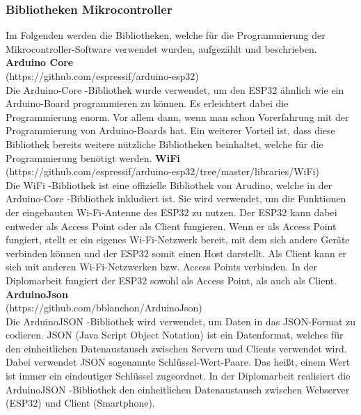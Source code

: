 \documentclass[11pt, twoside]{article}
\begin{document}
\subsubsection{Bibliotheken Mikrocontroller}
Im Folgenden werden die Bibliotheken, welche für die Programmierung der Mikrocontroller-Software verwendet wurden, aufgezählt und beschrieben.
\vspace{4mm}\newline
\textbf{Arduino Core} \\
(https://github.com/espressif/arduino-esp32) \\
Die \glqq Arduino-Core \grqq{} -Bibliothek wurde verwendet, um den ESP32 ähnlich wie ein Arduino-Board programmieren zu können. Es erleichtert dabei die Programmierung enorm. Vor allem dann, wenn man schon Vorerfahrung mit der Programmierung von Arduino-Boards hat. Ein weiterer Vorteil ist, dass diese Bibliothek bereits weitere nützliche Bibliotheken beinhaltet, welche für die Programmierung benötigt werden.
\vspace{4mm}\newline
\textbf{WiFi} \\
(https://github.com/espressif/arduino-esp32/tree/master/libraries/WiFi) \\
Die \grqq{} WiFi \grqq{} -Bibliothek ist eine offizielle Bibliothek von Arudino, welche in der \grqq{} Arduino-Core \grqq{} -Bibliothek inkludiert ist. Sie wird verwendet, um die Funktionen der eingebauten Wi-Fi-Antenne des ESP32 zu nutzen. Der ESP32 kann dabei entweder als Access Point oder als Client fungieren. Wenn er als Access Point fungiert, stellt er ein eigenes Wi-Fi-Netzwerk bereit, mit dem sich andere Geräte verbinden können und der ESP32 somit einen Host darstellt. Als Client kann er sich mit anderen Wi-Fi-Netzwerken bzw. Access Points verbinden. In der Diplomarbeit fungiert der ESP32 sowohl als Access Point, als auch als Client. \parencite[vgl.][]{noauthor_urlpi24_nodate}
\vspace{4mm}\newline
\textbf{ArduinoJson} \\
(https://github.com/bblanchon/ArduinoJson) \\
Die \glqq ArduinoJSON \grqq{} -Bibliothek wird verwendet, um Daten in das JSON-Format zu codieren. JSON (Java Script Object Notation) ist ein Datenformat, welches  für den einheitlichen Datenaustausch zwischen Servern und Clients verwendet wird. Dabei verwendet JSON sogenannte Schlüssel-Wert-Paare. Das heißt, einem Wert ist immer ein eindeutiger Schlüssel zugeordnet. In der Diplomarbeit realisiert die \glqq ArduinoJSON \grqq{} -Bibliothek den einheitlichen Datenaustausch zwischen Webserver (ESP32) und Client (Smartphone). \parencite[vgl.][]{noauthor_urlpi11_nodate}
\end{document}
